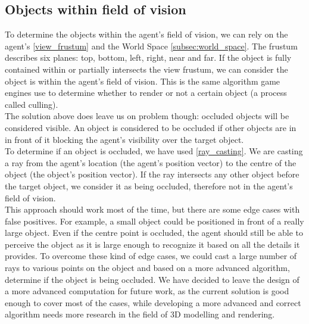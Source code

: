 \subsection{Objects within field of vision}\label{subsec:visible_objects}
To determine the objects within the agent's field of vision, we can rely on the agent's \ref{view_frustum} and the World Space \ref{subsec:world_space}. The frustum describes six planes: top, bottom, left, right, near and far. If the object is fully contained within or partially intersects the view frustum, we can consider the object is within the agent's field of vision. This is the same algorithm game engines use to determine whether to render or not a certain object (a process called culling).\\

The solution above does leave us on problem though: occluded objects will be considered visible. An object is considered to be occluded if other objects are in in front of it blocking the agent's visibility over the target object.\\

To determine if an object is occluded, we have used \ref{ray_casting}. We are casting a ray from the agent's location (the agent's position vector) to the centre of the object (the object's position vector). If the ray intersects any other object before the target object, we consider it as being occluded, therefore not in the agent's field of vision.\\

This approach should work most of the time, but there are some edge cases with false positives. For example, a small object could be positioned in front of a really large object. Even if the centre point is occluded, the agent should still be able to perceive the object as it is large enough to recognize it based on all the details it provides. To overcome these kind of edge cases, we could cast a large number of rays to various points on the object and based on a more advanced algorithm, determine if the object is being occluded. We have decided to leave the design of a more advanced computation for future work, as the current solution is good enough to cover most of the cases, while developing a more advanced and correct algorithm needs more research in the field of 3D modelling and rendering.\\

